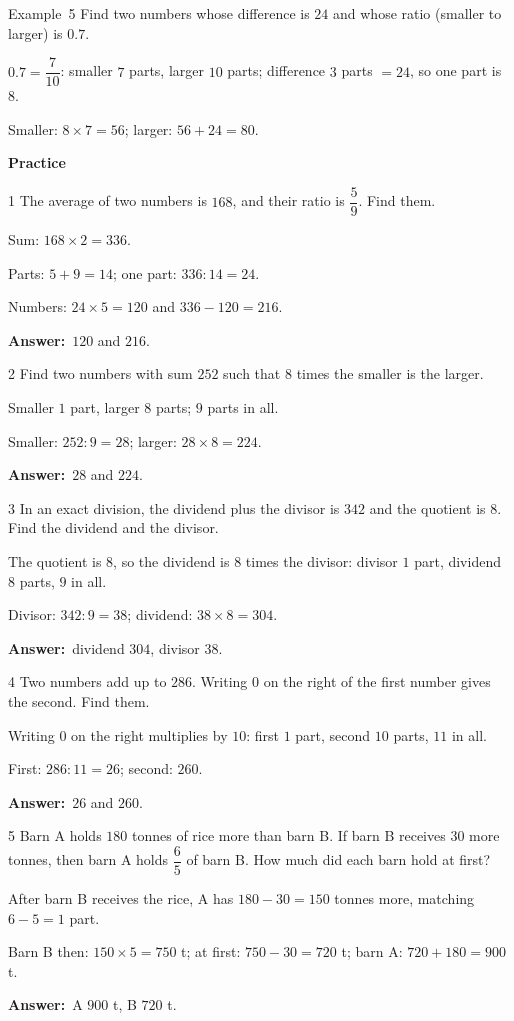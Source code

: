 \documentclass[11pt]{article}
\newif\ifsol \solfalse
\providecommand{\AnsWord}{Đáp số}
\newcommand{\dapso}[1]{\par\textbf{\AnsWord:}\ #1}
\newcommand{\guide}{\par\vspace{4pt}{\bfseries\color{tmBlue}\GuideWord}\par\vspace{3pt}\nopagebreak}
\newcommand{\probsol}[1]{%
  \begin{lrbox}{\solmeasure}\begin{minipage}{\dimexpr\linewidth-24pt\relax}#1\end{minipage}\end{lrbox}%
  \ifsol
    \begin{solbox}#1\end{solbox}%
  \else
    \setlength{\solht}{\dimexpr\ht\solmeasure+\dp\solmeasure+0.85cm\relax}%
    \ifdim\solht<1.35cm\setlength{\solht}{1.35cm}\fi
    \begin{tcolorbox}[colback=white,colframe=Line,boxrule=0.8pt,arc=5pt,
      left=8pt,right=8pt,top=4pt,bottom=4pt,height=\solht]{\footnotesize\color{Slate}\itshape\WorkWord}\end{tcolorbox}%
  \fi}
\newcommand{\dividerbar}[1]{\par\vspace{0.6em}\noindent
  \begin{tcolorbox}[enhanced,frame hidden,interior hidden,borderline west={5pt}{0pt}{ProbBlue},
    colback=white,left=12pt,right=12pt,top=5pt,bottom=5pt,arc=4pt]
  {\large\bfseries\color{ProbBlue} #1}\end{tcolorbox}\vspace{0.4em}}
\newcommand{\gap}{\vspace{0.3cm}}
\def\GuideWord{Guided solution.}
\def\WorkWord{Your work:}
\def\AnsWord{Answer}
\def\ExWord{Example}
\begin{document}
\gap
\begin{exbox}{\ExWord\ 5}
Find two numbers whose difference is $24$ and whose ratio (smaller to larger) is $0.7$.
\guide
$0.7=\dfrac7{10}$: smaller $7$ parts, larger $10$ parts; difference $3$ parts $=24$, so one part is $8$.\par
Smaller: $8\times7=56$; larger: $56+24=80$.
\end{exbox}
\dividerbar{Practice}
\begin{probbox}{1}{\relax}
The average of two numbers is $168$, and their ratio is $\dfrac59$. Find them.
\end{probbox}
\probsol{
Sum: $168\times2=336$.\par Parts: $5+9=14$; one part: $336:14=24$.\par Numbers: $24\times5=120$ and $336-120=216$.
\dapso{$120$ and $216$.}}
\gap
\begin{probbox}{2}{\relax}
Find two numbers with sum $252$ such that $8$ times the smaller is the larger.
\end{probbox}
\probsol{
Smaller $1$ part, larger $8$ parts; $9$ parts in all.\par Smaller: $252:9=28$; larger: $28\times8=224$.
\dapso{$28$ and $224$.}}
\gap
\begin{probbox}{3}{\relax}
In an exact division, the dividend plus the divisor is $342$ and the quotient is $8$. Find the dividend and the divisor.
\end{probbox}
\probsol{
The quotient is $8$, so the dividend is $8$ times the divisor: divisor $1$ part, dividend $8$ parts, $9$ in all.\par
Divisor: $342:9=38$; dividend: $38\times8=304$.
\dapso{dividend $304$, divisor $38$.}}
\gap
\begin{probbox}{4}{\relax}
Two numbers add up to $286$. Writing $0$ on the right of the first number gives the second. Find them.
\end{probbox}
\probsol{
Writing $0$ on the right multiplies by $10$: first $1$ part, second $10$ parts, $11$ in all.\par
First: $286:11=26$; second: $260$.
\dapso{$26$ and $260$.}}
\gap
\begin{probbox}{5}{\relax}
Barn A holds $180$ tonnes of rice more than barn B. If barn B receives $30$ more tonnes, then barn A holds $\dfrac65$ of barn B. How much did each barn hold at first?
\end{probbox}
\probsol{
After barn B receives the rice, A has $180-30=150$ tonnes more, matching $6-5=1$ part.\par
Barn B then: $150\times5=750$ t; at first: $750-30=720$ t; barn A: $720+180=900$ t.
\dapso{A $900$ t, B $720$ t.}}
\end{document}
